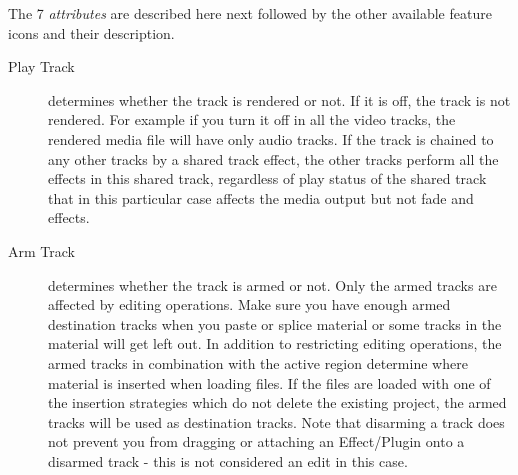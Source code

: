 The 7 \textit{attributes} are described here next followed by the other available feature icons and their description.

\begin{description}
\item[Play Track]  determines whether the track is rendered or
  not. If it is off, the track is not rendered.  For example if you
  turn it off in all the video tracks, the rendered media file will
  have only audio tracks.  If the track is chained to any other tracks
  by a shared track effect, the other tracks perform all the effects
  in this shared track, regardless of play status of the shared track
  that in this particular case affects the media output but not fade
  and effects.
\item[Arm Track]  determines whether the track is armed or not.
  Only the armed tracks are affected by editing operations. Make sure
  you have enough armed destination tracks when you paste or splice
  material or some tracks in the material will get left out.  In
  addition to restricting editing operations, the armed tracks in
  combination with the active region determine where material is
  inserted when loading files.  If the files are loaded with one of
  the insertion strategies which do not delete the existing project,
  the armed tracks will be used as destination tracks.  Note that disarming
  a track does not prevent you from dragging or attaching an Effect/Plugin
  onto a disarmed track - this is not considered an edit in this case.
\end{description}

